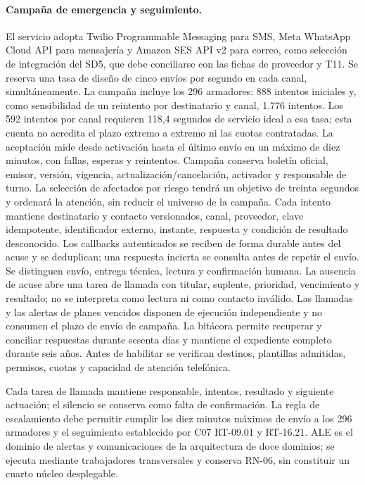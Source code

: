 \paragraph{Campaña de emergencia y seguimiento.}
El servicio adopta Twilio Programmable Messaging para SMS, Meta WhatsApp Cloud API para mensajería y Amazon SES API v2 para correo, como selección de integración del SD5, que debe conciliarse con las fichas de proveedor y T11. Se reserva una tasa de diseño de cinco envíos por segundo en cada canal, simultáneamente. La campaña incluye los 296 armadores: 888 intentos iniciales y, como sensibilidad de un reintento por destinatario y canal, 1.776 intentos. Los 592 intentos por canal requieren 118,4 segundos de servicio ideal a esa tasa; esta cuenta no acredita el plazo extremo a extremo ni las cuotas contratadas. La aceptación mide desde activación hasta el último envío en un máximo de diez minutos, con fallas, esperas y reintentos.
Campaña conserva boletín oficial, emisor, versión, vigencia, actualización/cancelación, activador y responsable de turno. La selección de afectados por riesgo tendrá un objetivo de treinta segundos y ordenará la atención, sin reducir el universo de la campaña. Cada intento mantiene destinatario y contacto versionados, canal, proveedor, clave idempotente, identificador externo, instante, respuesta y condición de resultado desconocido. Los callbacks autenticados se reciben de forma durable antes del acuse y se deduplican; una respuesta incierta se consulta antes de repetir el envío.
Se distinguen envío, entrega técnica, lectura y confirmación humana. La ausencia de acuse abre una tarea de llamada con titular, suplente, prioridad, vencimiento y resultado; no se interpreta como lectura ni como contacto inválido. Las llamadas y las alertas de planes vencidos disponen de ejecución independiente y no consumen el plazo de envío de campaña. La bitácora permite recuperar y conciliar respuestas durante sesenta días y mantiene el expediente completo durante seis años. Antes de habilitar se verifican destinos, plantillas admitidas, permisos, cuotas y capacidad de atención telefónica.

 Cada tarea de llamada mantiene responsable, intentos, resultado y siguiente actuación; el silencio se conserva como falta de confirmación. La regla de escalamiento debe permitir cumplir los diez minutos máximos de envío a los 296 armadores y el seguimiento establecido por C07 RT-09.01 y RT-16.21. ALE es el dominio de alertas y comunicaciones de la arquitectura de doce dominios; se ejecuta mediante trabajadores transversales y conserva RN-06, sin constituir un cuarto núcleo desplegable.

